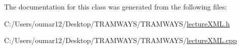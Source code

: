 The documentation for this class was generated from the following files\+:\begin{DoxyCompactItemize}
\item 
C\+:/\+Users/oumar12/\+Desktop/\+T\+R\+A\+M\+W\+A\+Y\+S/\+T\+R\+A\+M\+W\+A\+Y\+S/\hyperlink{lecture_x_m_l_8h}{lecture\+X\+M\+L.\+h}\item 
C\+:/\+Users/oumar12/\+Desktop/\+T\+R\+A\+M\+W\+A\+Y\+S/\+T\+R\+A\+M\+W\+A\+Y\+S/\hyperlink{lecture_x_m_l_8cpp}{lecture\+X\+M\+L.\+cpp}\end{DoxyCompactItemize}
